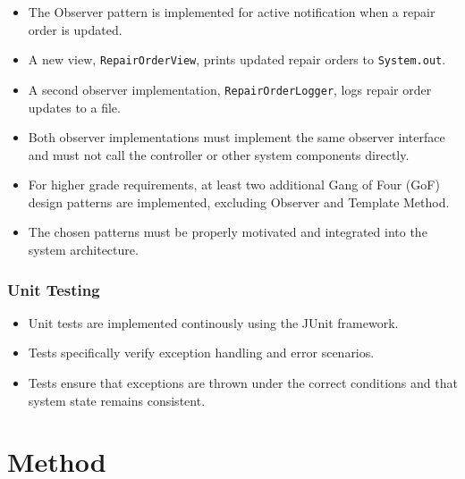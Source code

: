 \documentclass[a4paper]{scrartcl}
\begin{document}
\begin{itemize}
    \item The Observer pattern is implemented for active notification when a repair order is updated.
    \item A new view, \texttt{RepairOrderView}, prints updated repair orders to \texttt{System.out}.
    \item A second observer implementation, \texttt{RepairOrderLogger}, logs repair order updates to a file.
    \item Both observer implementations must implement the same observer interface and must not call the controller or other system components directly.
    \item For higher grade requirements, at least two additional Gang of Four (GoF) design patterns are implemented, excluding Observer and Template Method.
    \item The chosen patterns must be properly motivated and integrated into the system architecture.
\end{itemize}

\subsubsection*{Unit Testing}

\begin{itemize}
    \item Unit tests are implemented continously using the JUnit framework.
    \item Tests specifically verify exception handling and error scenarios.
    \item Tests ensure that exceptions are thrown under the correct conditions and that system state remains consistent.
\end{itemize}

\fi

\section{Method}

\end{document}
